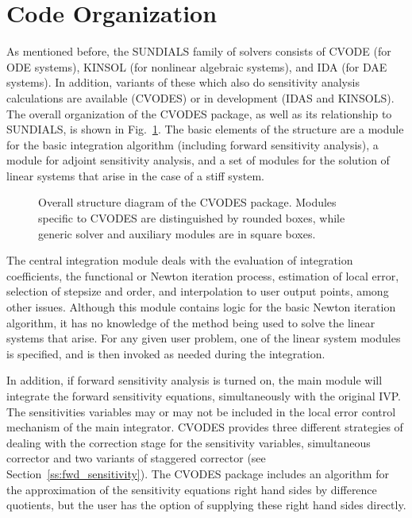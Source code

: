 \section{Code Organization}\label{s:organization}

As mentioned before, the SUNDIALS family of solvers consists of 
CVODE (for ODE systems), KINSOL (for nonlinear algebraic
systems), and IDA (for DAE systems).  
In addition, variants of these which also do sensitivity analysis calculations are
available (CVODES) or in development (IDAS and KINSOLS).
%
The overall organization of the CVODES package, as well as its relationship
to SUNDIALS, is shown in Fig.~\ref{f:cvsorg}.  
The basic elements of the structure are a module for
the basic integration algorithm (including forward sensitivity analysis),
a module for adjoint sensitivity analysis, and a set of modules for the solution
of linear systems that arise in the case of a stiff system.  
\begin{figure}
\centerline{}
\caption {Overall structure diagram of the CVODES package.
  Modules specific to CVODES are distinguished by rounded boxes, while 
  generic solver and auxiliary modules are in square boxes.}
\label{f:cvsorg}
\end{figure}

The central integration module deals with the evaluation of integration coefficients,
the functional or Newton iteration process, estimation of local error,
selection of stepsize and order, and interpolation to user output
points, among other issues.  Although this module contains logic for
the basic Newton iteration algorithm, it has no knowledge of the
method being used to solve the linear systems that arise.  For any
given user problem, one of the linear system modules is specified, and
is then invoked as needed during the integration. 

In addition, if forward sensitivity analysis is turned on, the main module 
will integrate the forward sensitivity equations, simultaneously with the original IVP.
The sensitivities variables may or may not be included in the local error control
mechanism of the main integrator.
CVODES provides three different strategies of dealing with the correction
stage for the sensitivity variables, simultaneous corrector and
two variants of staggered corrector (see Section~\ref{ss:fwd_sensitivity}).
The CVODES package includes an algorithm for the approximation of the sensitivity 
equations right hand sides by difference quotients, but the user has the option of 
supplying these right hand sides directly.

